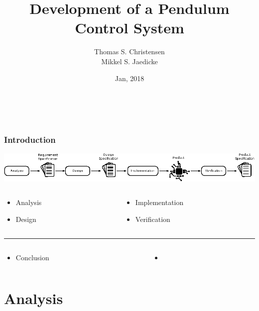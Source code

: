 \documentclass[mathserif]{beamer}
\title{Development of a Pendulum Control System}
\author{Thomas S. Christensen \\ Mikkel S. Jaedicke\\}
\institute{University of Southern Denmark}
\date{Jan, 2018}
\begin{document}
\begin{frame}[t]\frametitle{~}
\maketitle
\end{frame}

\begin{frame}[c]\frametitle{Introduction}
\includegraphics[width=\textwidth]{graphics/workflow}
\vfill
	\begin{columns}
		\begin{column}[c]{.5\textwidth}
			\begin{itemize}
				\item \alert<1>{Analysis}
				\item \alert<2>{Design}
			\end{itemize}
		\end{column}
		\begin{column}[c]{.5\textwidth}
			\begin{itemize}
				\item \alert<3>{Implementation}
				\item \alert<4>{Verification}
			\end{itemize}
		\end{column}
	\end{columns}
	\vspace{0.5cm}
	\hrule
	\vspace{0.4cm}
	
	\begin{columns}
		\begin{column}[c]{.5\textwidth}
			\begin{itemize}
				\item<5> \alert<5>{Conclusion}
			\end{itemize}
		\end{column}
		\begin{column}[c]{.5\textwidth}
			\begin{itemize}
				\item[~]
			\end{itemize}
		\end{column}
	\end{columns}
\end{frame}

\section{Analysis}
\end{document}
